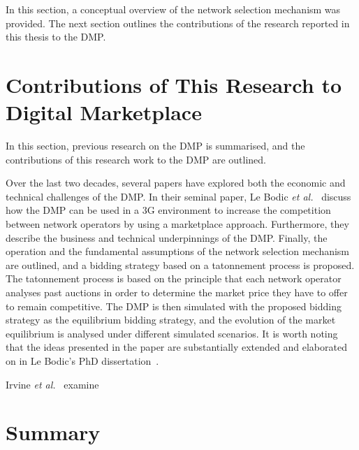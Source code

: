 In this section, a conceptual overview of the network selection mechanism was provided. The next section outlines the contributions of the research reported in this thesis to the DMP.

\section{Contributions of This Research to Digital Marketplace} %
\label{sec:contributions_of_this_research_to_digital_marketplace_dmp}
In this section, previous research on the DMP is summarised, and the contributions of this research work to the DMP are outlined.

Over the last two decades, several papers have explored both the economic and technical challenges of the DMP. In their seminal paper, Le Bodic \emph{et al.}~\cite{DMLeBodic00} discuss how the DMP can be used in a 3G environment to increase the competition between network operators by using a marketplace approach. Furthermore, they describe the business and technical underpinnings of the DMP. Finally, the operation and the fundamental assumptions of the network selection mechanism are outlined, and a bidding strategy based on a tatonnement process is proposed. The tatonnement process is based on the principle that each network operator analyses past auctions in order to determine the market price they have to offer to remain competitive. The DMP is then simulated with the proposed bidding strategy as the equilibrium bidding strategy, and the evolution of the market equilibrium is analysed under different simulated scenarios. It is worth noting that the ideas presented in the paper are substantially extended and elaborated on in Le Bodic's PhD dissertation~\cite{LeBodicThesis}.

Irvine \emph{et al.}~\cite{DMIrvine01} examine

\section{Summary} %
\label{sec:summary_dmp}

